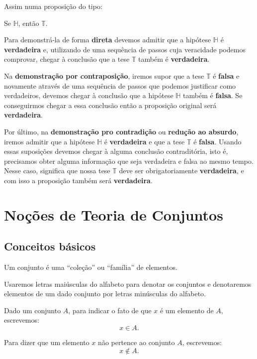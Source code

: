 Assim numa proposição do tipo:
\begin{center}
    Se $\mathbb{H}$, então $\mathbb{T}$.
\end{center}

Para demonstrá-la de forma \textbf{direta} devemos admitir que a hipótese $\mathbb{H}$ é \textbf{verdadeira} e, utilizando de uma sequência de passos
cuja veracidade podemos comprovar, chegar à conclusão que a tese $\mathbb{T}$ também é \textbf{verdadeira}.

Na \textbf{demonstração por contraposição}, iremos supor que a tese $\mathbb{T}$ é \textbf{falsa} e novamente através de uma
sequência de passos que podemos justificar como verdadeiros, devemos chegar à conclusão que a hipótese $\mathbb{H}$ também é
\textbf{falsa}. Se conseguirmos chegar a essa conclusão então a proposição original será \textbf{verdadeira}.

Por último, na \textbf{demonstração pro contradição} ou \textbf{redução ao absurdo}, iremos admitir que a hipótese
$\mathbb{H}$ é \textbf{verdadeira} e que a tese $\mathbb{T}$ é \textbf{falsa}. Usando essas suposições devemos chegar à alguma
conclusão contraditória, isto é, precisamos obter alguma informação que seja verdadeira e falsa ao mesmo tempo. Nesse caso,
significa que nossa tese $\mathbb{T}$ deve ser obrigatoriamente \textbf{verdadeira}, e com isso a proposição também será
\textbf{verdadeira}.



\chapter{Noções de Teoria de Conjuntos}
\section{Conceitos básicos}

Um conjunto é uma ``coleção'' ou ``família'' de elementos.

Usaremos letras maiúsculas do alfabeto para denotar os conjuntos e denotaremos elementos de um dado conjunto por letras minúsculas do alfabeto.

Dado um conjunto $A$, para indicar o fato de que $x$ é um elemento de $A$, escrevemos:
\[
    x \in A.
\]

Para dizer que um elemento $x$ não pertence ao conjunto $A$, escrevemos:
\[
    x \notin A.
\]

